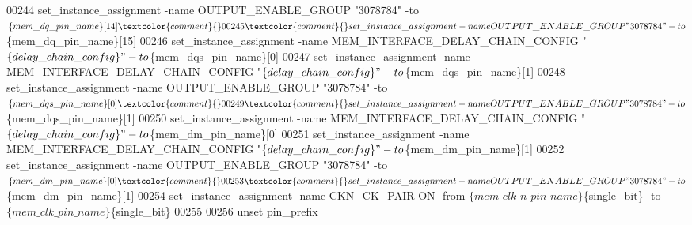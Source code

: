 \begin{DoxyCode}
00244 \textcolor{comment}{}set\_instance\_assignment -name OUTPUT\_ENABLE\_GROUP "3078784" -to $\{mem\_dq\_pin\_name\}[14]\textcolor{comment}{}
00245 \textcolor{comment}{}set\_instance\_assignment -name OUTPUT\_ENABLE\_GROUP "3078784" -to $\{mem\_dq\_pin\_name\}[15]\textcolor{comment}{}
00246 \textcolor{comment}{}set\_instance\_assignment -name MEM\_INTERFACE\_DELAY\_CHAIN\_CONFIG "$\{delay\_chain\_config\}" -to 
      $\{mem\_dqs\_pin\_name\}[0]\textcolor{comment}{}
00247 \textcolor{comment}{}set\_instance\_assignment -name MEM\_INTERFACE\_DELAY\_CHAIN\_CONFIG "$\{delay\_chain\_config\}" -to 
      $\{mem\_dqs\_pin\_name\}[1]\textcolor{comment}{}
00248 \textcolor{comment}{}set\_instance\_assignment -name OUTPUT\_ENABLE\_GROUP "3078784" -to $\{mem\_dqs\_pin\_name\}[0]\textcolor{comment}{}
00249 \textcolor{comment}{}set\_instance\_assignment -name OUTPUT\_ENABLE\_GROUP "3078784" -to $\{mem\_dqs\_pin\_name\}[1]\textcolor{comment}{}
00250 \textcolor{comment}{}set\_instance\_assignment -name MEM\_INTERFACE\_DELAY\_CHAIN\_CONFIG "$\{delay\_chain\_config\}" -to 
      $\{mem\_dm\_pin\_name\}[0]\textcolor{comment}{}
00251 \textcolor{comment}{}set\_instance\_assignment -name MEM\_INTERFACE\_DELAY\_CHAIN\_CONFIG "$\{delay\_chain\_config\}" -to 
      $\{mem\_dm\_pin\_name\}[1]\textcolor{comment}{}
00252 \textcolor{comment}{}set\_instance\_assignment -name OUTPUT\_ENABLE\_GROUP "3078784" -to $\{mem\_dm\_pin\_name\}[0]\textcolor{comment}{}
00253 \textcolor{comment}{}set\_instance\_assignment -name OUTPUT\_ENABLE\_GROUP "3078784" -to $\{mem\_dm\_pin\_name\}[1]\textcolor{comment}{}
00254 \textcolor{comment}{}set\_instance\_assignment -name CKN\_CK\_PAIR ON -from $\{mem\_clk\_n\_pin\_name\}$\{single\_bit\} -to 
      $\{mem\_clk\_pin\_name\}$\{single\_bit\}\textcolor{comment}{}
00255 \textcolor{comment}{}
00256 unset pin\_prefix
\end{DoxyCode}
